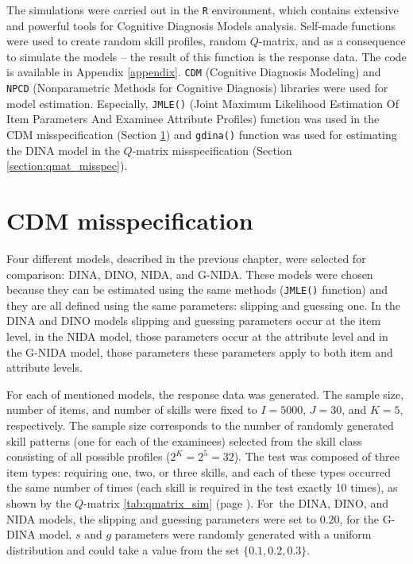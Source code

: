\documentclass[english]{pwr_wmat_praca_dyplomowa}
\theoremstyle{plain}
\numberwithin{theorem}{chapter}
\theoremstyle{definition}
\numberwithin{theorem}{chapter}
\begin{document}
	The simulations were carried out in the \texttt{R} environment, which contains extensive and powerful tools for Cognitive Diagnosis Models analysis. Self-made functions were used to create random skill profiles, random $Q$-matrix, and as a consequence to simulate the models -- the result of this function is the response data. The code is available in Appendix \ref{appendix}. \texttt{CDM} (Cognitive Diagnosis Modeling) and \texttt{NPCD} (Nonparametric Methods for Cognitive Diagnosis) libraries were used for model estimation. Especially, \texttt{JMLE()} (Joint Maximum Likelihood Estimation Of Item Parameters And Examinee Attribute Profiles) function was used in the CDM misspecification (Section \ref{section:cdm_misspec}) and \texttt{gdina()} function was used for estimating the DINA model in the $Q$-matrix misspecification (Section \ref{section:qmat_misspec}).
	
	
	\section{CDM misspecification}\label{section:cdm_misspec}
	
	Four different models, described in the previous chapter, were selected for comparison: DINA, DINO, NIDA, and G-NIDA. These models were chosen because they can be estimated using the same methods (\texttt{JMLE()} function) and they are all defined using the same parameters: slipping and guessing one. In the DINA and DINO models slipping and guessing parameters occur at the item level, in the NIDA model, those parameters occur at the attribute level and in the G-NIDA model, those parameters these parameters apply to both item and attribute levels. 
	
	For each of mentioned models, the response data was generated. The sample size, number of items, and number of skills were fixed to $I=5000$, $J=30$, and $K=5$, respectively. The sample size corresponds to the number of randomly generated skill patterns (one for each of the examinees) selected from the skill class consisting of all possible profiles ($2^K = 2^5 = 32$). The test was composed of three item types: requiring one, two, or three skills, and each of these types occurred the same number of times (each skill is required in the test exactly 10 times), as shown by the $Q$-matrix \ref{tab:qmatrix_sim} (page \pageref{tab:qmatrix_sim}). For~the DINA, DINO, and NIDA models, the slipping and guessing parameters were set to $0.20$, for the G-DINA model, $s$ and $g$ parameters were randomly generated with a uniform distribution and could take a value from the set $\{0.1,0.2,0.3\}$. 
	
\end{document}

